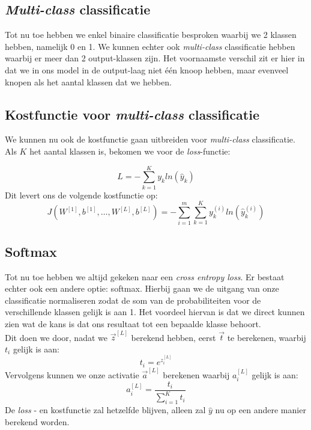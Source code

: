\subsection{\textit{Multi-class} classificatie}

Tot nu toe hebben we enkel binaire classificatie besproken waarbij we 2 klassen hebben, namelijk 0 en 1. We kunnen echter ook \textit{multi-class} classificatie hebben waarbij er meer dan 2 output-klassen zijn. Het voornaamste verschil zit er hier in dat we in ons model in de output-laag niet één knoop hebben, maar evenveel knopen als het aantal klassen dat we hebben.

\subsection{Kostfunctie voor \textit{multi-class} classificatie}

We kunnen nu ook de kostfunctie gaan uitbreiden voor \textit{multi-class} classificatie. Als $K$ het aantal klassen is, bekomen we voor de \textit{loss}-functie:

\begin{equation}
	L = - \sum_{k=1}^{K} y_{k} ln( \hat{y}_{k})
\end{equation}
\noindent
Dit levert ons de volgende kostfunctie op:
\begin{equation}
	J(W^{[1]}, b^{[1]}, \ldots , W^{[L]}, b^{[L]}) = - \sum_{i=1}^{m} \sum_{k=1}^{K} y_{k}^{(i)} ln( \hat{y}_{k}^{(i)})
\end{equation}

\subsection{Softmax}
\label{ch:softmax}
Tot nu toe hebben we altijd gekeken naar een \textit{cross entropy loss}. Er bestaat echter ook een andere optie: softmax. Hierbij gaan we de uitgang van onze classificatie normaliseren zodat de som van de probabiliteiten voor de verschillende klassen gelijk is aan 1. Het voordeel hiervan is dat we direct kunnen zien wat de kans is dat ons resultaat tot een bepaalde klasse behoort.\\
\newline
Dit doen we door, nadat we $\vec{z}^{[L]}$ berekend hebben, eerst $\vec{t}$ te berekenen, waarbij $t_{i}$ gelijk is aan:
\begin{equation}
	t_{i} = e^{z_{i}^{[L]}}
\end{equation}
\noindent
Vervolgens kunnen we onze activatie $\vec{a}^{[L]}$ berekenen waarbij $a_{i}^{[L]}$ gelijk is aan:
\begin{equation}
	a_{i}^{[L]} = \frac{t_{i}}{\sum_{i=1}^{K} t_{i}}
\end{equation}
\noindent
De \textit{loss} - en kostfunctie zal hetzelfde blijven, alleen zal $\hat{y}$ nu op een andere manier berekend worden. 

